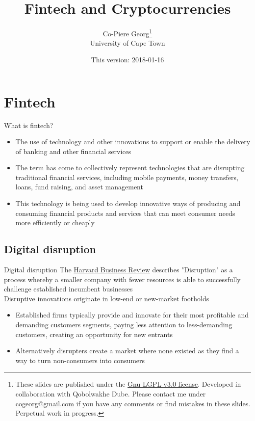\documentclass[9pt]{beamer}
\title
{Fintech and Cryptocurrencies}
\author[Co-Pierre Georg]
{
Co-Piere Georg\footnote{These slides are published under the \href{https://www.gnu.org/licenses/lgpl-3.0.en.html}{Gnu LGPL v3.0 license}. Developed in collaboration with Qobolwakhe Dube. Please contact me under \url{cogeorg@gmail.com} if you have any comments or find mistakes in these slides. Perpetual work in progress.}\\
University of Cape Town
}
\date
{This version: 2018-01-16}
\begin{document}
\begin{frame}
  \titlepage
\end{frame}


\section{Fintech}

\begin{frame}{What is fintech?}
	\begin{itemize}
		\item The use of technology and other innovations to support or enable the delivery of banking and other financial services
		\item The term has come to collectively represent technologies that are disrupting traditional financial services, including mobile payments, money transfers, loans, fund raising, and asset management
		\item This technology is being used to develop innovative ways of producing and consuming financial products and services that can meet consumer needs more efficiently or cheaply
	\end{itemize}
\end{frame}

\subsection{Digital disruption}

\begin{frame}{Digital disruption}
	The \href{https://hbr.org/2015/12/what-is-disruptive-innovation}{Harvard Business Review} describes "Disruption" as a process whereby a smaller company with fewer resources is able to successfully challenge established incumbent businesses \\ \vspace{3mm}
	Disruptive innovations originate in low-end or new-market footholds
	\begin{itemize}
		\item Established firms typically provide and innovate for their most profitable and demanding customers segments, paying less attention to less-demanding customers, creating an opportunity for new entrants
		\item Alternatively disrupters create a market where none existed as they find a way to turn non-consumers into consumers
	\end{itemize}
\end{frame}
\end{document}
